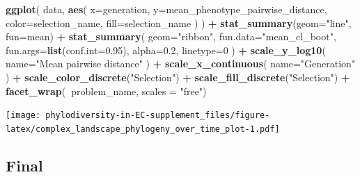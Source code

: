 \documentclass[]{book}
\newenvironment{Shaded}{\begin{snugshade}}{\end{snugshade}}
\newcommand{\DataTypeTok}[1]{\textcolor[rgb]{0.13,0.29,0.53}{#1}}
\newcommand{\DecValTok}[1]{\textcolor[rgb]{0.00,0.00,0.81}{#1}}
\newcommand{\FloatTok}[1]{\textcolor[rgb]{0.00,0.00,0.81}{#1}}
\newcommand{\KeywordTok}[1]{\textcolor[rgb]{0.13,0.29,0.53}{\textbf{#1}}}
\newcommand{\NormalTok}[1]{#1}
\newcommand{\OperatorTok}[1]{\textcolor[rgb]{0.81,0.36,0.00}{\textbf{#1}}}
\newcommand{\StringTok}[1]{\textcolor[rgb]{0.31,0.60,0.02}{#1}}
\begin{document}
\begin{Shaded}
\begin{Highlighting}[]
\KeywordTok{ggplot}\NormalTok{(}
\NormalTok{    data,}
    \KeywordTok{aes}\NormalTok{(}
      \DataTypeTok{x=}\NormalTok{generation,}
      \DataTypeTok{y=}\NormalTok{mean_phenotype_pairwise_distance,}
      \DataTypeTok{color=}\NormalTok{selection_name,}
      \DataTypeTok{fill=}\NormalTok{selection_name}
\NormalTok{    )}
\NormalTok{  ) }\OperatorTok{+}
\StringTok{  }\KeywordTok{stat_summary}\NormalTok{(}\DataTypeTok{geom=}\StringTok{"line"}\NormalTok{, }\DataTypeTok{fun=}\NormalTok{mean) }\OperatorTok{+}
\StringTok{  }\KeywordTok{stat_summary}\NormalTok{(}
    \DataTypeTok{geom=}\StringTok{"ribbon"}\NormalTok{,}
    \DataTypeTok{fun.data=}\StringTok{"mean_cl_boot"}\NormalTok{,}
    \DataTypeTok{fun.args=}\KeywordTok{list}\NormalTok{(}\DataTypeTok{conf.int=}\FloatTok{0.95}\NormalTok{),}
    \DataTypeTok{alpha=}\FloatTok{0.2}\NormalTok{,}
    \DataTypeTok{linetype=}\DecValTok{0}
\NormalTok{  ) }\OperatorTok{+}
\StringTok{  }\KeywordTok{scale_y_log10}\NormalTok{(}
    \DataTypeTok{name=}\StringTok{"Mean pairwise distance"}
\NormalTok{  ) }\OperatorTok{+}
\StringTok{  }\KeywordTok{scale_x_continuous}\NormalTok{(}
    \DataTypeTok{name=}\StringTok{"Generation"}
\NormalTok{  ) }\OperatorTok{+}
\StringTok{  }\KeywordTok{scale_color_discrete}\NormalTok{(}\StringTok{"Selection"}\NormalTok{) }\OperatorTok{+}
\StringTok{  }\KeywordTok{scale_fill_discrete}\NormalTok{(}\StringTok{"Selection"}\NormalTok{) }\OperatorTok{+}
\StringTok{  }\KeywordTok{facet_wrap}\NormalTok{(}\OperatorTok{~}\NormalTok{problem_name, }\DataTypeTok{scales =} \StringTok{"free"}\NormalTok{)}
\end{Highlighting}
\end{Shaded}

\texttt{[image: phylodiversity-in-EC-supplement\_files/figure-latex/complex\_landscape\_phylogeny\_over\_time\_plot-1.pdf]}

\hypertarget{final-4}{%
\subsection{Final}\label{final-4}}
\end{document}
